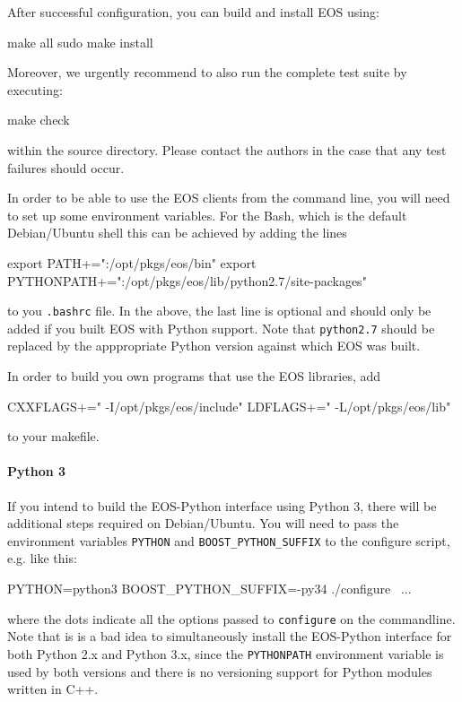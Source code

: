 After successful configuration, you can build and install EOS using:
%
\begin{commandline}
make all
sudo make install
\end{commandline}
%
Moreover, we urgently recommend to also run the complete test suite by executing:
%
\begin{commandline}
make check
\end{commandline}
%
within the source directory. Please contact the authors in the case that any
test failures should occur.


In order to be able to use the EOS clients from the command line, you will need to
set up some environment variables. For the Bash, which is the default Debian/Ubuntu
shell this can be achieved by adding the lines
\begin{commandline}
export PATH+=":/opt/pkgs/eos/bin"
export PYTHONPATH+=":/opt/pkgs/eos/lib/python2.7/site-packages"
\end{commandline}
to you \texttt{.bashrc} file. In the above, the last line is optional and should only be
added if you built EOS with Python support. Note that \texttt{python2.7} should be
replaced by the apppropriate Python version against which EOS was built.


In order to build you own programs that use the EOS libraries,
add
\begin{commandline}
CXXFLAGS+=" -I/opt/pkgs/eos/include"
LDFLAGS+=" -L/opt/pkgs/eos/lib"
\end{commandline}
to your makefile.

\paragraph{Python 3} If you intend to build the EOS-Python interface using Python 3, there will be
additional steps required on Debian/Ubuntu. You will need to pass the environment variables
\texttt{PYTHON} and \texttt{BOOST\_PYTHON\_SUFFIX} to the configure script, e.g. like this:
\begin{commandline}
PYTHON=python3 BOOST_PYTHON_SUFFIX=-py34 ./configure \
    ...
\end{commandline}
where the dots indicate all the options passed to \texttt{configure} on the commandline.
Note that is is a bad idea to simultaneously install the EOS-Python interface for both
Python 2.x and Python 3.x, since the \texttt{PYTHONPATH} environment variable is used
by both versions and there is no versioning support for Python modules written in C++.
